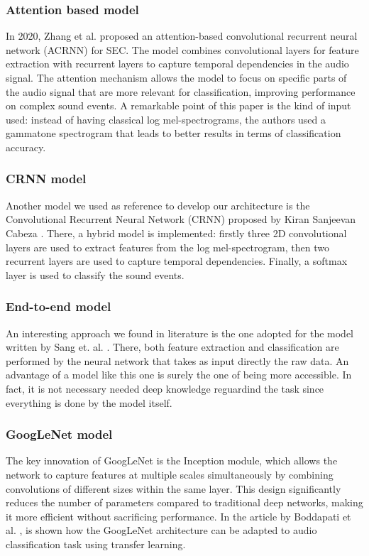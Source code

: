 \documentclass{article}
\begin{document}
\begin{sloppy}
\subsubsection{Attention based model}
\label{sec:attention_based_model}
In 2020, Zhang et al. \cite{zhang2019attentionbasedconvolutionalrecurrent} proposed an attention-based convolutional recurrent neural network (ACRNN) for SEC.
The model combines convolutional layers for feature extraction with recurrent layers to capture temporal dependencies in the audio signal.
The attention mechanism allows the model to focus on specific parts of the audio signal that are more relevant for classification, improving performance on complex sound events.
A remarkable point of this paper is the kind of input used: instead of having classical log mel-spectrograms, the authors used a gammatone spectrogram that leads
to better results in terms of classification accuracy.

\subsubsection{CRNN model}
\label{sec:CRNN_model}
Another model we used as reference to develop our architecture is the Convolutional Recurrent Neural Network (CRNN) proposed by Kiran Sanjeevan Cabeza \cite{crnn_audio_classification}.
There, a hybrid model is implemented: firstly three 2D convolutional layers are used to extract features from the log mel-spectrogram, then two recurrent layers are used to capture temporal dependencies.
Finally, a softmax layer is used to classify the sound events.

\subsubsection{End-to-end model}
\label{sec:endtoend_model}
An interesting approach we found in literature is the one adopted for the model written by Sang et. al. \cite{end_to_end}. There,
both feature extraction and classification are performed by the neural network that takes as input directly the raw data.
An advantage of a model like this one is surely the one of being more accessible. In fact, it is not necessary needed deep knowledge reguardind the task
since everything is done by the model itself.


\subsubsection{GoogLeNet model}
\label{sec:GoogLeNet_model}
The key innovation of GoogLeNet \cite{google} is the Inception module, which allows the network to capture features at multiple scales
simultaneously by combining convolutions of different sizes within the same layer. This design significantly reduces the
number of parameters compared to traditional deep networks, making it more efficient without sacrificing performance.
In the article by Boddapati et al. \cite{google_transfer}, is shown how the GoogLeNet architecture can be adapted to audio classification task using transfer learning.


\end{sloppy}
\end{document}
